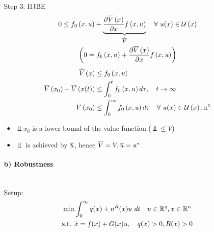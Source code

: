 Step 3: HJBE
\begin{gather*}
0 \leq f_0 \paren{x,u} +
    \underbrace{\pdein{\Vbar{x}}{x} f \paren{x,u}}_{\Vbard{}}
    \quad \forall ~u(x)\in \setU{x}\\
\left( 0 = f_0 \paren{x,u} +
    \pdein{\Vbar{x}}{x} f \paren{x,u} \right)
\end{gather*}
\begin{align*}
\-\Vbard{x} &\leq f_0 \paren{x,u}\\
\Vbar{x_0} - \Vbar{x(t)} &\leq \int_0^t f_0 \paren{x,u} d\tau, \quad t \rightarrow \infty\\
\Vbar{x_0} &\leq \int_0^\infty f_0 \paren{x,u} d\tau \quad \forall    ~ u(x) \in \setU{x}, \txt{n}\footnotemark
\end{align*}

\begin{itemize}
\item $\Vbar{x_0}$ is a lower bound of the value function ($\Vbar{} \leq V$)
\item $\Vbar{}$ is achieved by $\ubar{}$, hence $\Vbar{} = V, \ubar{} = u^*$
\end{itemize}

\paragraph{b) Robustness}~\\
Setup:
\begin{gather*}
\min \int_{0}^{\infty} q(x) + u^R(x)u ~dt \quad u \in \mathbb{R}^q, x\in\mathbb{R}^n\\
\textnormal{s.t. } \dot{x} = f(x) + G(x)u, \quad q(x)>0, R(x)>0
\end{gather*}

